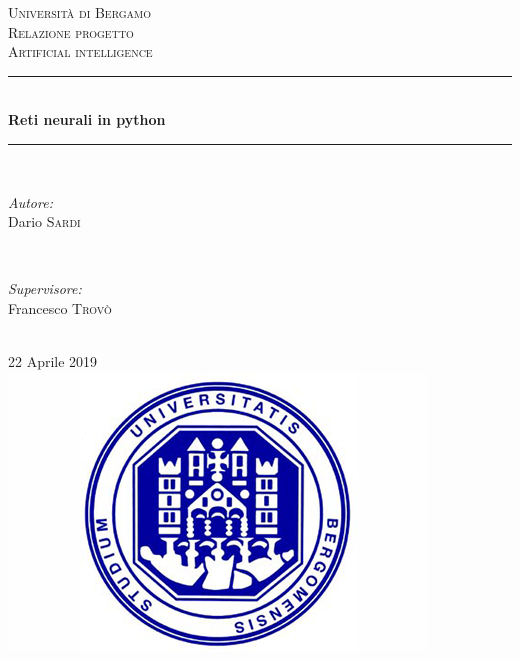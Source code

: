 \documentclass[12pt]{article}
\begin{document}
\begin{titlepage}

\newcommand{\HRule}{\rule{\linewidth}{0.5mm}} %

\center %
 

\textsc{\LARGE Università di Bergamo}\\[1.5cm] %
\textsc{\Large Relazione progetto}\\[0.5cm] %
\textsc{\large Artificial intelligence}\\[0.5cm] %


\HRule \\[0.4cm]
{ \huge \bfseries Reti neurali in python}\\[0.3cm] %
\HRule \\[1.5cm]
 
\begin{minipage}{0.4\textwidth}
\begin{flushleft} \large
\emph{Autore:}\\
Dario \textsc{Sardi} %
\end{flushleft}
\end{minipage}
~
\begin{minipage}{0.4\textwidth}
\begin{flushright} \large
\emph{Supervisore:} \\
Francesco \textsc{Trovò} %
\end{flushright}
\end{minipage}\\[2cm]
{\large 22 Aprile 2019}\\[2cm] %
\includegraphics[scale=0.5]{logo.png}\\[1cm] %
\vfill %


\end{titlepage}
\end{document}
